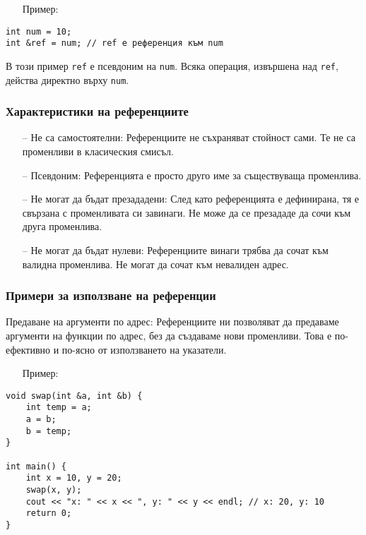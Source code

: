 \documentclass[oneside]{book}
\newcommand*{\code}[1]{\texttt{#1}}
\begin{document}
\begin{itemize}\item[Пример:]\end{itemize}
\begin{mdframed}\begin{lstlisting}
int num = 10;
int &ref = num; // ref е референция към num
\end{lstlisting}\end{mdframed}

В този пример \code{ref} е псевдоним на \code{num}. Всяка операция, извършена над \code{ref}, действа директно върху \code{num}.

\subsubsection{Характеристики на референциите}
\begin{itemize}
    \item[--] Не са самостоятелни: Референциите не съхраняват стойност сами. Те не са променливи в класическия смисъл.
    \item[--] Псевдоним: Референцията е просто друго име за съществуваща променлива.
    \item[--] Не могат да бъдат презададени: След като референцията е дефинирана, тя е свързана с променливата си завинаги. Не може да се презададе да сочи към друга променлива.
    \item[--] Не могат да бъдат нулеви: Референциите винаги трябва да сочат към валидна променлива. Не могат да сочат към невалиден адрес.    
\end{itemize}

\subsubsection{Примери за използване на референции}
Предаване на аргументи по адрес: Референциите ни позволяват да предаваме аргументи на функции по адрес, без да създаваме нови променливи. Това е по-ефективно и по-ясно от използването на указатели.

\begin{itemize}\item[Пример:]\end{itemize}
\begin{mdframed}\begin{lstlisting}
void swap(int &a, int &b) {
    int temp = a;
    a = b;
    b = temp;
}

int main() {
    int x = 10, y = 20;
    swap(x, y);
    cout << "x: " << x << ", y: " << y << endl; // x: 20, y: 10
    return 0;
}
\end{lstlisting}\end{mdframed}
\end{document}
